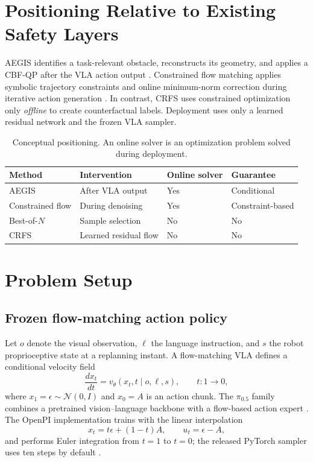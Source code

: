 \documentclass[10pt,conference]{IEEEtran}
\newcommand{\method}{\textsc{CRFS}}
\newcommand{\pizero}{\ensuremath{\pi_{0.5}}}
\newcommand{\1}{\mathbf{1}}
\begin{document}
\section{Positioning Relative to Existing Safety Layers}

AEGIS identifies a task-relevant obstacle, reconstructs its geometry, and applies a CBF-QP after the VLA action output \cite{hu2025vlsa}. Constrained flow matching applies symbolic trajectory constraints and online minimum-norm correction during iterative action generation \cite{english2026constrained}. In contrast, \method{} uses constrained optimization only \emph{offline} to create counterfactual labels. Deployment uses only a learned residual network and the frozen VLA sampler.

\begin{table}[t]
\centering
\caption{Conceptual positioning. An online solver is an optimization problem solved during deployment.}
\label{tab:positioning}
\scriptsize
\setlength{\tabcolsep}{2.5pt}
\begin{tabular}{@{}p{1.35cm}p{1.85cm}p{1.05cm}p{1.35cm}@{}}
\toprule
Method & Intervention & Online solver & Guarantee \\
\midrule
AEGIS \cite{hu2025vlsa} & After VLA output & Yes & Conditional \\
Constrained flow \cite{english2026constrained} & During denoising & Yes & Constraint-based \\
Best-of-$N$ & Sample selection & No & No \\
\method{} & Learned residual flow & No & No \\
\bottomrule
\end{tabular}
\end{table}

\section{Problem Setup}

\subsection{Frozen flow-matching action policy}

Let $o$ denote the visual observation, $\ell$ the language instruction, and $s$ the robot proprioceptive state at a replanning instant. A flow-matching VLA defines a conditional velocity field \cite{lipman2023flow}
\begin{equation}
    \frac{d x_t}{dt} = v_\theta(x_t,t\mid o,\ell,s),
    \qquad t:1\rightarrow 0,
    \label{eq:baseflow}
\end{equation}
where $x_1=\epsilon\sim\mathcal{N}(0,I)$ and $x_0=A$ is an action chunk. The \pizero{} family combines a pretrained vision--language backbone with a flow-based action expert \cite{black2024pi0,black2025pi05}. The OpenPI implementation trains with the linear interpolation
\begin{equation}
    x_t = t\epsilon + (1-t)A,
    \qquad
    u_t = \epsilon-A,
    \label{eq:flowbridge}
\end{equation}
and performs Euler integration from $t=1$ to $t=0$; the released PyTorch sampler uses ten steps by default \cite{openpirepo,vlsarepo}.
\end{document}
